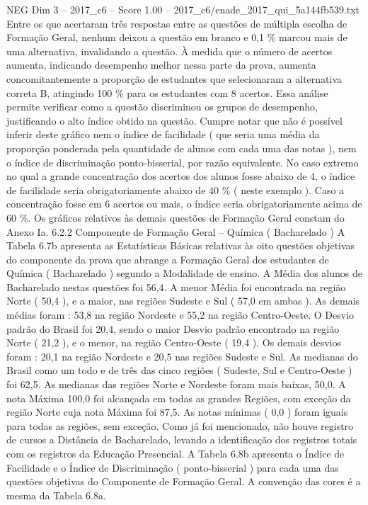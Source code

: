 \begin{textsample}{NEG Dim 3 – 2017\_c6 – Score 1.00 – 2017\_c6/enade\_2017\_qui\_5a144fb539.txt}
Entre os que acertaram três respostas entre as questões de múltipla escolha de Formação Geral, nenhum deixou a questão em branco e 0,1 \% marcou mais de uma alternativa, invalidando a questão.
À medida que o número de acertos aumenta, indicando desempenho melhor nessa parte da prova, aumenta concomitantemente a proporção de estudantes que selecionaram a alternativa correta B, atingindo 100 \% para os estudantes com 8 acertos.
Essa análise permite verificar como a questão discriminou os grupos de desempenho, justificando o alto índice obtido na questão.
Cumpre notar que não é possível inferir deste gráfico nem o índice de facilidade ( que seria uma média da proporção ponderada pela quantidade de alunos com cada uma das notas ), nem o índice de discriminação ponto-bisserial, por razão equivalente.
No caso extremo no qual a grande concentração dos acertos dos alunos fosse abaixo de 4, o índice de facilidade seria obrigatoriamente abaixo de 40 \% ( neste exemplo ).
Caso a concentração fosse em 6 acertos ou mais, o índice seria obrigatoriamente acima de 60 \%.
Os gráficos relativos às demais questões de Formação Geral constam do Anexo Ia. 6.2.2 Componente de Formação Geral – Química ( Bacharelado ) A Tabela 6.7b apresenta as Estatísticas Básicas relativas às oito questões objetivas do componente da prova que abrange a Formação Geral dos estudantes de Química ( Bacharelado ) segundo a Modalidade de ensino.
A Média dos alunos de Bacharelado nestas questões foi 56,4.
A menor Média foi encontrada na região Norte ( 50,4 ), e a maior, nas regiões Sudeste e Sul ( 57,0 em ambas ).
As demais médias foram : 53,8 na região Nordeste e 55,2 na região Centro-Oeste.
O Desvio padrão do Brasil foi 20,4, sendo o maior Desvio padrão encontrado na região Norte ( 21,2 ), e o menor, na região Centro-Oeste ( 19,4 ).
Os demais desvios foram : 20,1 na região Nordeste e 20,5 nas regiões Sudeste e Sul.
As medianas do Brasil como um todo e de três das cinco regiões ( Sudeste, Sul e Centro-Oeste ) foi 62,5.
As medianas das regiões Norte e Nordeste foram mais baixas, 50,0.
A nota Máxima 100,0 foi alcançada em todas as grandes Regiões, com exceção da região Norte cuja nota Máxima foi 87,5.
As notas mínimas ( 0,0 ) foram iguais para todas as regiões, sem exceção.
Como já foi mencionado, não houve registro de cursos a Distância de Bacharelado, levando a identificação dos registros totais com os registros da Educação Presencial.
A Tabela 6.8b apresenta o Índice de Facilidade e o Índice de Discriminação ( ponto-bisserial ) para cada uma das questões objetivas do Componente de Formação Geral.
A convenção das cores é a mesma da Tabela 6.8a.

\end{textsample}
